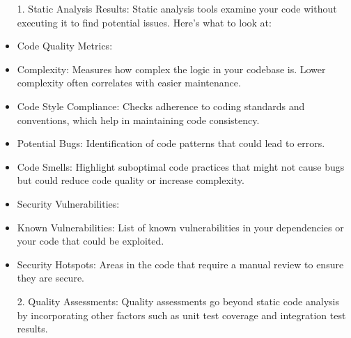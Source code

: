\documentclass[12pt, a4paper, oneside]{book}
\begin{document}
\begin{itemize}

    \item[1.] Static Analysis Results:
Static analysis tools examine your code without executing it to find potential issues. Here's what to look at:

\item Code Quality Metrics:
\item Complexity: Measures how complex the logic in your codebase is. Lower complexity often correlates with easier maintenance.
\item Code Style Compliance: Checks adherence to coding standards and conventions, which help in maintaining code consistency.
\item Potential Bugs: Identification of code patterns that could lead to errors.
\item Code Smells: Highlight suboptimal code practices that might not cause bugs but could reduce code quality or increase complexity.
\item Security Vulnerabilities:
\item Known Vulnerabilities: List of known vulnerabilities in your dependencies or your code that could be exploited.
\item Security Hotspots: Areas in the code that require a manual review to ensure they are secure.
\item[2.] Quality Assessments:
Quality assessments go beyond static code analysis by incorporating other factors such as unit test coverage and integration test results.



\end{itemize}
\end{document}

